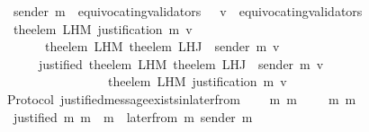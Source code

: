 \begin{isabellebody}
\ \ {\isasymlongrightarrow}\ sender\ m{\isacharprime}\ {\isasymnotin}\ equivocating{\isacharunderscore}validators\ {\isasymsigma}\ {\isasymand}\ v\ {\isasymnotin}\ equivocating{\isacharunderscore}validators\ {\isasymsigma}{\isacharprime}\isanewline
\ \ {\isasymlongrightarrow}\ the{\isacharunderscore}elem\ {\isacharparenleft}L{\isacharunderscore}H{\isacharunderscore}M\ {\isacharparenleft}justification\ m{\isacharprime}{\isacharparenright}\ v{\isacharparenright}\ \isanewline
\ \ \ \ \ \ \ {\isacharequal}\ the{\isacharunderscore}elem\ {\isacharparenleft}L{\isacharunderscore}H{\isacharunderscore}M\ {\isacharparenleft}the{\isacharunderscore}elem\ {\isacharparenleft}L{\isacharunderscore}H{\isacharunderscore}J\ {\isasymsigma}\ {\isacharparenleft}sender\ m{\isacharprime}{\isacharparenright}{\isacharparenright}{\isacharparenright}\ v{\isacharparenright}\isanewline
\ \ \ \ \ \ {\isasymor}\ justified\ {\isacharparenleft}the{\isacharunderscore}elem\ {\isacharparenleft}L{\isacharunderscore}H{\isacharunderscore}M\ {\isacharparenleft}the{\isacharunderscore}elem\ {\isacharparenleft}L{\isacharunderscore}H{\isacharunderscore}J\ {\isasymsigma}\ {\isacharparenleft}sender\ m{\isacharprime}{\isacharparenright}{\isacharparenright}{\isacharparenright}\ v{\isacharparenright}{\isacharparenright}\ \isanewline
\ \ \ \ \ \ \ \ \ \ \ \ \ \ \ \ \ \ {\isacharparenleft}the{\isacharunderscore}elem\ {\isacharparenleft}L{\isacharunderscore}H{\isacharunderscore}M\ {\isacharparenleft}justification\ m{\isacharprime}{\isacharparenright}\ v{\isacharparenright}{\isacharparenright}{\isachardoublequoteclose}\isanewline
%
\isadelimproof
\ \ %
\endisadelimproof
%
\isatagproof
{}\isamarkupfalse%
%
\endisatagproof
{\isafoldproof}%
%
\isadelimproof
\isanewline
%
\endisadelimproof
\isanewline
\isanewline
{}\isamarkupfalse%
\ {\isacharparenleft}\ Protocol{\isacharparenright}\ justified{\isacharunderscore}message{\isacharunderscore}exists{\isacharunderscore}in{\isacharunderscore}later{\isacharunderscore}from{\isacharcolon}\isanewline
\ \ {\isachardoublequoteopen}{\isasymforall}\ {\isasymsigma}\ m{}\ m{}{\isachardot}\ {\isasymsigma}\ {\isasymin}\ {\isasymSigma}\ {\isasymand}\ {\isacharbraceleft}m{}{\isacharcomma}\ m{}{\isacharbraceright}\ {\isasymsubseteq}\ {\isasymsigma}\isanewline
\ \ {\isasymlongrightarrow}\ justified\ m{}\ m{}\ {\isasymlongrightarrow}\ m{}\ {\isasymin}\ later{\isacharunderscore}from\ {\isacharparenleft}m{}{\isacharcomma}\ sender\ m{}{\isacharcomma}\ {\isasymsigma}{\isacharparenright}{\isachardoublequoteclose}\isanewline

\end{isabellebody}
